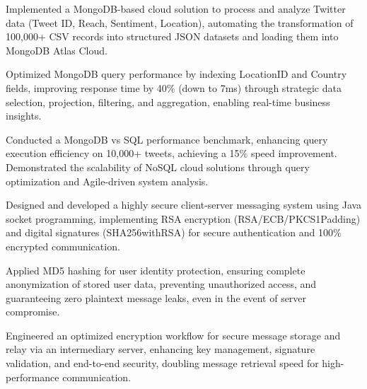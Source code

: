\documentclass[]{resumebb}
\begin{document}
\sectionsep
{}
\begin{tightemize}
    \item Implemented a MongoDB-based cloud solution to process and analyze Twitter data (Tweet ID, Reach, Sentiment, Location), automating the transformation of 100,000+ CSV records into structured JSON datasets and loading them into MongoDB Atlas Cloud.
    \item Optimized MongoDB query performance by indexing LocationID and Country fields, improving response time by 40\% (down to 7ms) through strategic data selection, projection, filtering, and aggregation, enabling real-time business insights.
    \item Conducted a MongoDB vs SQL performance benchmark, enhancing query execution efficiency on 10,000+ tweets, achieving a 15\% speed improvement. Demonstrated the scalability of NoSQL cloud solutions through query optimization and Agile-driven system analysis.
\end{tightemize}
\sectionsep
{}
\begin{tightemize}
    \item Designed and developed a highly secure client-server messaging system using Java socket programming, implementing RSA encryption (RSA/ECB/PKCS1Padding) and digital signatures (SHA256withRSA) for secure authentication and 100\% encrypted communication.
    \item Applied MD5 hashing for user identity protection, ensuring complete anonymization of stored user data, preventing unauthorized access, and guaranteeing zero plaintext message leaks, even in the event of server compromise.
    \item Engineered an optimized encryption workflow for secure message storage and relay via an intermediary server, enhancing key management, signature validation, and end-to-end security, doubling message retrieval speed for high-performance communication.
\end{tightemize}
\vspace{-3pt}
\end{document}

